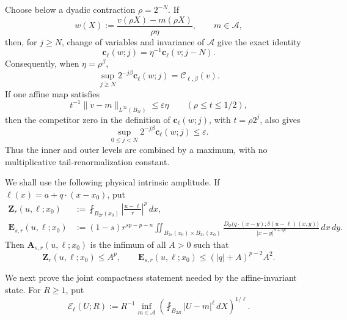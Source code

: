 \documentclass[11pt,reqno]{amsart}
\numberwithin{equation}{section}
\newcommand{\dd}{\,d}
\theoremstyle{remark}
\begin{document}
Choose below a dyadic contraction \(\rho=2^{-N}\).  If
\begin{equation}
 w(X):=\frac{v(\rho X)-m(\rho X)}{\rho\eta},
 \qquad m\in\mathcal A,
 \label{eq:affine-invariant-rescaling}
\end{equation}
then, for \(j\ge N\), change of variables and invariance of
\(\mathcal A\) give the exact identity
\begin{equation}
 \mathbf c_\ell(w;j)=\eta^{-1}\mathbf c_\ell(v;j-N).
 \label{eq:exact-affine-excess-shift}
\end{equation}
Consequently, when \(\eta=\rho^\beta\),
\begin{equation}
 \sup_{j\ge N}2^{-j\beta}\mathbf c_\ell(w;j)
 =\mathscr C_{\ell,\beta}(v).
 \label{eq:exact-affine-weight-cancellation}
\end{equation}
If one affine map satisfies
\begin{equation}
 t^{-1}\|v-m\|_{L^\infty(B_{2t})}\le\varepsilon\eta
 \qquad(\rho\le t\le1/2),
 \label{eq:common-affine-inner-block}
\end{equation}
then the competitor zero in the definition of
\(\mathbf c_\ell(w;j)\), with \(t=\rho2^j\), also gives
\begin{equation}
 \sup_{0\le j<N}2^{-j\beta}\mathbf c_\ell(w;j)\le\varepsilon.
 \label{eq:common-affine-inner-levels}
\end{equation}
Thus the inner and outer levels are combined by a maximum, with no
multiplicative tail-renormalization constant.

We shall use the following physical intrinsic amplitude.  If
$\ell(x)=a+q\cdot(x-x_0)$, put
\begin{align*}
 \mathbf Z_r(u,\ell;x_0)
 &:={\fint}_{B_{2r}(x_0)}
 \left|\frac{u-\ell}{r}\right|^p\dd x,\\
 \mathbf E_{s,r}(u,\ell;x_0)
 &:=(1-s)r^{sp-p-n}
 \iint_{B_{2r}(x_0)\times B_{2r}(x_0)}
 \frac{D_\Phi\bigl(q\cdot(x-y);\delta(u-\ell)(x,y)\bigr)}
 {|x-y|^{n+sp}}\dd x\!\dd y.
\end{align*}
Then $\mathbf A_{s,r}(u,\ell;x_0)$ is the infimum of all $A>0$
such that
\begin{equation*}
 \mathbf Z_r(u,\ell;x_0)\le A^p,
 \qquad
 \mathbf E_{s,r}(u,\ell;x_0)
 \le(|q|+A)^{p-2}A^2.
\end{equation*}

We next prove the joint compactness statement needed by the
affine-invariant state.  For \(R\ge1\), put
\begin{equation}
 \mathscr E_\ell(U;R):=R^{-1}\inf_{m\in\mathcal A}
 \left(\fint_{B_{2R}}|U-m|^\ell\dd X\right)^{1/\ell}.
 \label{eq:continuous-affine-excess-main}
\end{equation}
\end{document}

